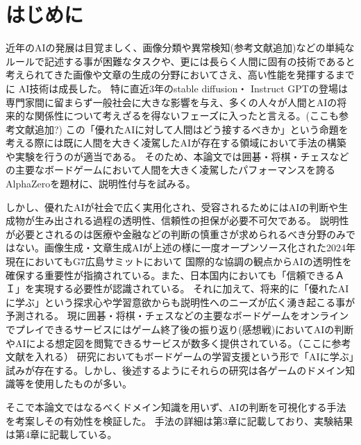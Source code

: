 \chapter{はじめに}
近年のAIの発展は目覚ましく、画像分類や異常検知(参考文献追加)などの単純なルールで記述する事が困難なタスクや、更には長らく人間に固有の技術であると考えられてきた画像や文章の生成の分野においてさえ、高い性能を発揮するまでに
AI技術は成長した。
特に直近3年のstable diffusion\cite{diffusion}・ Instruct GPT\cite{GPT}の登場は専門家間に留まらず一般社会に大きな影響を与え、多くの人々が人間とAIの将来的な関係性について考えざるを得ないフェーズに入ったと言える。(ここも参考文献追加?)
この「優れたAIに対して人間はどう接するべきか」という命題を考える際には既に人間を大きく凌駕したAIが存在する領域において手法の構築や実験を行うのが適当である。
そのため、本論文では囲碁・将棋・チェスなどの主要なボードゲームにおいて人間を大きく凌駕したパフォーマンスを誇るAlphaZero\cite{AlphaZero}を題材に、説明性付与を試みる。

しかし、優れたAIが社会で広く実用化され、受容されるためにはAIの判断や生成物が生み出される過程の透明性、信頼性の担保が必要不可欠である。
説明性が必要とされるのは医療や金融などの判断の慎重さが求められるべき分野のみではない。画像生成・文章生成AIが上述の様に一度オープンソース化された2024年現在においてもG7広島サミットにおいて
国際的な協調の観点からAIの透明性を確保する重要性が指摘されている\cite{Hiroshima}。また、日本国内においても「信頼できるＡＩ」を実現する必要性が認識されている\cite{グランドデザイン}。
それに加えて、将来的に「優れたAIに学ぶ」という探求心や学習意欲からも説明性へのニーズが広く湧き起こる事が予測される。
現に囲碁・将棋・チェスなどの主要なボードゲームをオンラインでプレイできるサービスにはゲーム終了後の振り返り(感想戦)においてAIの判断やAIによる想定図を閲覧できるサービスが数多く提供されている。（ここに参考文献を入れる）
研究においてもボードゲームの学習支援という形で「AIに学ぶ」試みが存在する。しかし、後述するようにそれらの研究は各ゲームのドメイン知識等を使用したものが多い。

そこで本論文ではなるべくドメイン知識を用いず、AIの判断を可視化する手法を考案しその有効性を検証した。
手法の詳細は第3章に記載しており、実験結果は第4章に記載している。

